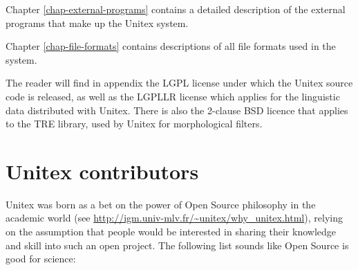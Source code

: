 \bigskip \noindent Chapter \ref{chap-external-programs} contains a
detailed description of the external programs that make up the Unitex system.

\bigskip \noindent Chapter \ref{chap-file-formats} contains
descriptions of all file formats used in the system. 


\bigskip \noindent The reader will find in appendix the LGPL license
under which the Unitex source code is released, as well as the LGPLLR license
which applies for the linguistic data distributed with Unitex. There is also
the 2-clause BSD licence that applies to the TRE library, used by Unitex for 
morphological filters.


\section*{Unitex contributors}
Unitex was born as a bet on the power of Open Source philosophy in the academic
world (see \url{http://igm.univ-mlv.fr/~unitex/why_unitex.html}), 
relying on the assumption that people would be interested in sharing
their knowledge and skill into such an open project. The following list
sounds like Open Source is good for science:

